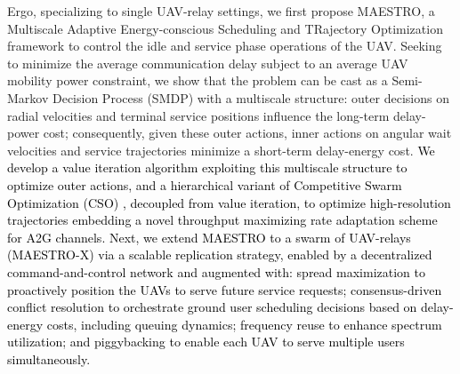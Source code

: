 \documentclass[12pt, draftcls, onecolumn]{IEEEtran}
\theoremstyle{plain}
\theoremstyle{definition}
\theoremstyle{remark}
\newcommand\hlt[1]{\textcolor{black}{#1}}
\begin{document}
Ergo, specializing to single UAV-relay settings, we first propose MAESTRO, a Multiscale Adaptive Energy-conscious Scheduling and TRajectory Optimization framework to control the idle and service phase operations of the UAV. Seeking to minimize the average communication delay subject to an average UAV mobility power constraint, we show that the problem can be cast as a Semi-Markov Decision Process (SMDP) with a multiscale structure: outer decisions on radial velocities and terminal service positions influence the long-term delay-power cost; consequently, given these outer actions, inner actions on angular wait velocities and service trajectories minimize a short-term delay-energy cost. \hlt{We develop a value iteration algorithm \cite{Bertsekas} exploiting this multiscale structure to optimize outer actions, and a hierarchical variant of Competitive Swarm Optimization (CSO) \cite{CSO}, decoupled from value iteration, to optimize high-resolution trajectories embedding a novel throughput maximizing rate adaptation scheme for A2G channels. Next, we extend MAESTRO to a swarm of UAV-relays (MAESTRO-X) via a scalable replication strategy, enabled by a decentralized command-and-control network and augmented with: spread maximization to proactively position the UAVs to serve future service requests; consensus-driven conflict resolution to orchestrate ground user scheduling decisions based on delay-energy costs, including queuing dynamics; frequency reuse to enhance spectrum utilization; and piggybacking to enable each UAV to serve multiple users simultaneously.}
\end{document}
